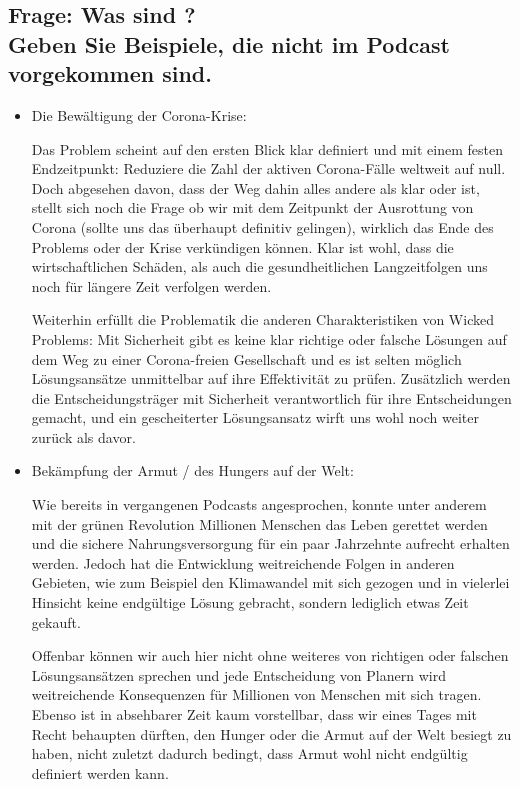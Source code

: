 \documentclass[twoside, a4paper, DIV=11, open=any, bibliography=totoc]{scrbook}
\begin{document}
\subsection{Frage: Was sind ? \\
Geben Sie Beispiele, die nicht im Podcast vorgekommen sind. }

\begin{itemize}
  \item Die Bewältigung der Corona-Krise:


  Das Problem scheint auf den ersten Blick klar definiert und mit einem
  festen Endzeitpunkt: Reduziere die Zahl der aktiven Corona-Fälle weltweit
  auf null. Doch abgesehen davon, dass der Weg dahin alles andere als klar
  oder  ist, stellt sich noch die Frage ob wir mit dem
  Zeitpunkt der Ausrottung von Corona (sollte uns das überhaupt definitiv gelingen),
  wirklich das Ende des Problems oder der Krise verkündigen können.
  Klar ist wohl, dass die wirtschaftlichen Schäden, als auch die gesundheitlichen
  Langzeitfolgen uns noch für längere Zeit verfolgen werden.


  Weiterhin erfüllt die Problematik die anderen Charakteristiken von Wicked Problems:
  Mit Sicherheit gibt es keine klar richtige oder falsche Lösungen auf dem Weg
  zu einer Corona-freien Gesellschaft und es ist selten möglich Lösungsansätze
  unmittelbar auf ihre Effektivität zu prüfen. Zusätzlich werden die Entscheidungsträger
  mit Sicherheit verantwortlich für ihre Entscheidungen gemacht, und ein
  gescheiterter Lösungsansatz wirft uns wohl noch weiter zurück als davor.
  \item Bekämpfung der Armut / des Hungers auf der Welt:


  Wie bereits in vergangenen Podcasts angesprochen, konnte
  unter anderem mit der grünen Revolution Millionen Menschen das Leben gerettet werden
  und die sichere Nahrungsversorgung für ein paar Jahrzehnte aufrecht erhalten werden.
  Jedoch hat die Entwicklung weitreichende Folgen in anderen Gebieten, wie zum
  Beispiel den Klimawandel mit sich gezogen und in vielerlei Hinsicht keine
  endgültige Lösung gebracht, sondern lediglich etwas Zeit gekauft.


  Offenbar können wir auch hier nicht ohne weiteres von richtigen oder falschen
  Lösungsansätzen sprechen und jede Entscheidung von Planern wird weitreichende
  Konsequenzen für Millionen von Menschen mit sich tragen. Ebenso ist in
  absehbarer Zeit kaum vorstellbar, dass wir eines Tages mit Recht behaupten
  dürften, den Hunger oder die Armut auf der Welt besiegt zu haben, nicht
  zuletzt dadurch bedingt, dass Armut wohl nicht endgültig definiert werden kann.

\end{itemize}
\end{document}

